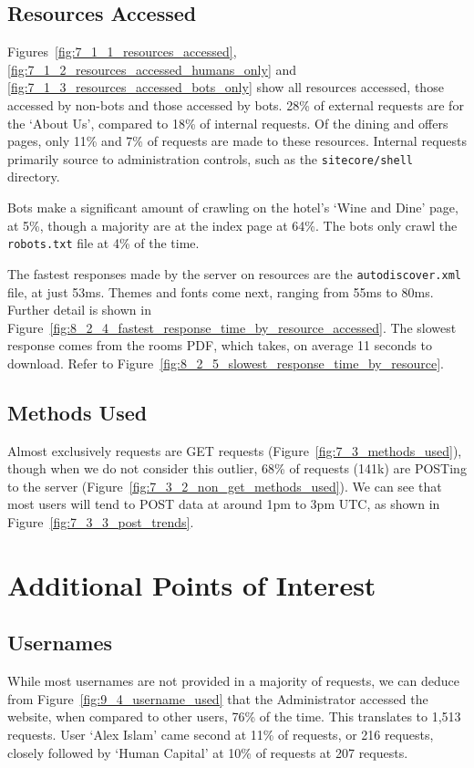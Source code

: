 \documentclass[12pt,titlepage]{article}
\begin{document}
\subsection{Resources Accessed}

Figures~\ref{fig:7_1_1_resources_accessed}, \ref{fig:7_1_2_resources_accessed_humans_only} and \ref{fig:7_1_3_resources_accessed_bots_only} show all resources accessed, those accessed by non-bots and those accessed by bots. 28\% of external requests are for the `About Us', compared to 18\% of internal requests. Of the dining and offers pages, only 11\% and 7\% of requests are made to these resources. Internal requests primarily source to administration controls, such as the \texttt{sitecore/shell} directory.

Bots make a significant amount of crawling on the hotel's `Wine and Dine' page, at 5\%, though a majority are at the index page at 64\%. The bots only crawl the \texttt{robots.txt} file at 4\% of the time.

The fastest responses made by the server on resources are the \texttt{autodiscover.xml} file, at just 53ms. Themes and fonts come next, ranging from 55ms to 80ms. Further detail is shown in Figure~\ref{fig:8_2_4_fastest_response_time_by_resource_accessed}. The slowest response comes from the rooms PDF, which takes, on average 11 seconds to download. Refer to Figure~\ref{fig:8_2_5_slowest_response_time_by_resource}.

\subsection{Methods Used}

Almost exclusively requests are GET requests (Figure~\ref{fig:7_3_methods_used}), though when we do not consider this outlier, 68\% of requests (141k) are POSTing to the server (Figure~\ref{fig:7_3_2_non_get_methods_used}). We can see that most users will tend to POST data at around 1pm to 3pm UTC, as shown in Figure~\ref{fig:7_3_3_post_trends}.

\section{Additional Points of Interest}

\subsection{Usernames}

While most usernames are not provided in a majority of requests, we can deduce from Figure~\ref{fig:9_4_username_used} that the Administrator accessed the website, when compared to other users, 76\% of the time. This translates to 1,513 requests. User `Alex Islam' came second at 11\% of requests, or 216 requests, closely followed by `Human Capital' at 10\% of requests at 207 requests.
\end{document}
